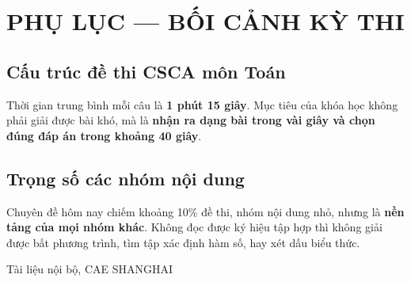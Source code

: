 \documentclass[11pt, a4paper]{article}
\begin{document}
\section{PHỤ LỤC — BỐI CẢNH KỲ THI}

\subsection{Cấu trúc đề thi CSCA môn Toán}


Thời gian trung bình mỗi câu là \textbf{1 phút 15 giây}. Mục tiêu của khóa học không phải giải được bài khó, mà là \textbf{nhận ra dạng bài trong vài giây và chọn đúng đáp án trong khoảng 40 giây}.

\subsection{Trọng số các nhóm nội dung}


Chuyên đề hôm nay chiếm khoảng 10\% đề thi, nhóm nội dung nhỏ, nhưng là \textbf{nền tảng của mọi nhóm khác}. Không đọc được ký hiệu tập hợp thì không giải được bất phương trình, tìm tập xác định hàm số, hay xét dấu biểu thức.
\vspace{0.8cm}
\begin{center}
{\footnotesize\color{cae_blue} Tài liệu nội bộ, CAE SHANGHAI}
\end{center}
\end{document}
